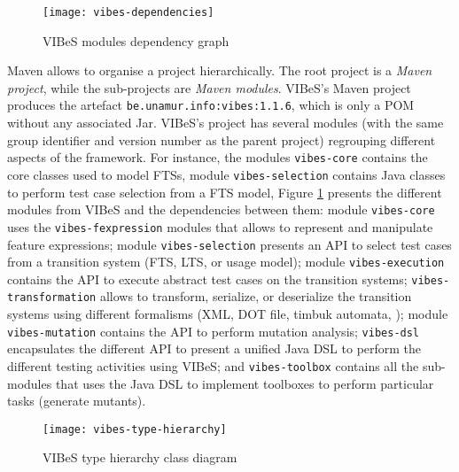 \begin{figure}
	\centering
	\texttt{[image: vibes-dependencies]}
	\caption{\gls{VIBeS} modules dependency graph}
	\label{fig:vibesdependencies}
\end{figure} 

Maven allows to organise a project hierarchically. The root project is a \emph{Maven project}, while the sub-projects are \emph{Maven modules}. \gls{VIBeS}'s Maven project produces the artefact \texttt{be.unamur.info:vibes:1.1.6}, which is only a \gls{POM} without any associated Jar. \gls{VIBeS}'s project has several modules (with the same group identifier and version number as the parent project) regrouping different aspects of the framework. For instance, the modules \texttt{vibes-core} contains the core classes used to model \glspl{FTS}, module \texttt{vibes-selection} contains Java classes to perform test case selection from a \gls{FTS} model, \etc Figure \ref{fig:vibesdependencies} presents the different modules from \gls{VIBeS} and the dependencies between them: module \texttt{vibes-core} uses the \texttt{vibes-fexpression} modules that allows to represent and manipulate feature expressions; module \texttt{vibes-selection} presents an \gls{API} to select test cases from a transition system (\gls{FTS}, \gls{LTS}, or \gls{usage model}); module \texttt{vibes-execution} contains the \gls{API} to execute abstract test cases on the transition systems; \texttt{vibes-transformation} allows to transform, serialize, or deserialize the transition systems using different formalisms (\eg XML, DOT file, timbuk automata, \etc); module \texttt{vibes-mutation} contains the \gls{API} to perform mutation analysis; \texttt{vibes-dsl} encapsulates the different \gls{API} to present a unified Java DSL to perform the different testing activities using \gls{VIBeS}; and \texttt{vibes-toolbox} contains all the sub-modules that uses the Java DSL to implement toolboxes to perform particular tasks (\eg generate mutants). 

\begin{figure}
	\centering
	\texttt{[image: vibes-type-hierarchy]}
	\caption{\gls{VIBeS} type hierarchy class diagram}
	\label{fig:vibestypehierarchy}
\end{figure} 


